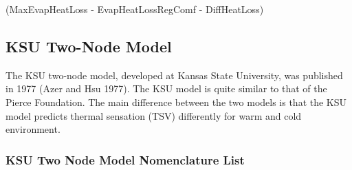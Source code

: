 (MaxEvapHeatLoss - EvapHeatLossRegComf - DiffHeatLoss)

\subsection{KSU Two-Node Model}\label{ksu-two-node-model}

The KSU two-node model, developed at Kansas State University, was published in 1977 (Azer and Hsu 1977). The KSU model is quite similar to that of the Pierce Foundation. The main difference between the two models is that the KSU model predicts thermal sensation (TSV) differently for warm and cold environment.

\subsubsection{KSU Two Node Model Nomenclature List}\label{ksu-two-node-model-nomenclature-list}

